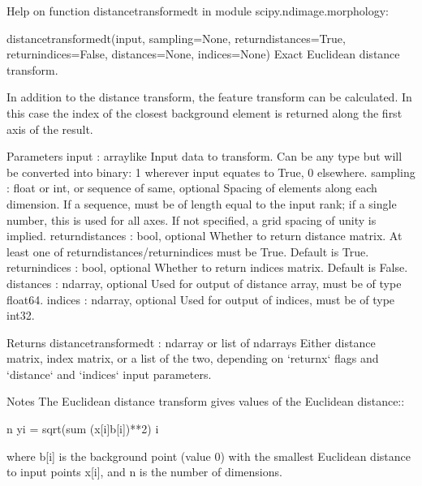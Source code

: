 \documentclass[letterpaper,10pt,english]{sphinxmanual}
\begin{document}
\begin{sphinxVerbatim}[commandchars=\\\{\}]
Help on function distance\PYGZus{}transform\PYGZus{}edt in module scipy.ndimage.morphology:

distance\PYGZus{}transform\PYGZus{}edt(input, sampling=None, return\PYGZus{}distances=True, return\PYGZus{}indices=False, distances=None, indices=None)
    Exact Euclidean distance transform.
    
    In addition to the distance transform, the feature transform can
    be calculated. In this case the index of the closest background
    element is returned along the first axis of the result.
    
    Parameters
    \PYGZhy{}\PYGZhy{}\PYGZhy{}\PYGZhy{}\PYGZhy{}\PYGZhy{}\PYGZhy{}\PYGZhy{}\PYGZhy{}\PYGZhy{}
    input : array\PYGZus{}like
        Input data to transform. Can be any type but will be converted
        into binary: 1 wherever input equates to True, 0 elsewhere.
    sampling : float or int, or sequence of same, optional
        Spacing of elements along each dimension. If a sequence, must be of
        length equal to the input rank; if a single number, this is used for
        all axes. If not specified, a grid spacing of unity is implied.
    return\PYGZus{}distances : bool, optional
        Whether to return distance matrix. At least one of
        return\PYGZus{}distances/return\PYGZus{}indices must be True. Default is True.
    return\PYGZus{}indices : bool, optional
        Whether to return indices matrix. Default is False.
    distances : ndarray, optional
        Used for output of distance array, must be of type float64.
    indices : ndarray, optional
        Used for output of indices, must be of type int32.
    
    Returns
    \PYGZhy{}\PYGZhy{}\PYGZhy{}\PYGZhy{}\PYGZhy{}\PYGZhy{}\PYGZhy{}
    distance\PYGZus{}transform\PYGZus{}edt : ndarray or list of ndarrays
        Either distance matrix, index matrix, or a list of the two,
        depending on `return\PYGZus{}x` flags and `distance` and `indices`
        input parameters.
    
    Notes
    \PYGZhy{}\PYGZhy{}\PYGZhy{}\PYGZhy{}\PYGZhy{}
    The Euclidean distance transform gives values of the Euclidean
    distance::
    
                    n
      y\PYGZus{}i = sqrt(sum (x[i]\PYGZhy{}b[i])**2)
                    i
    
    where b[i] is the background point (value 0) with the smallest
    Euclidean distance to input points x[i], and n is the
    number of dimensions.
    

\end{sphinxVerbatim}
\end{document}
